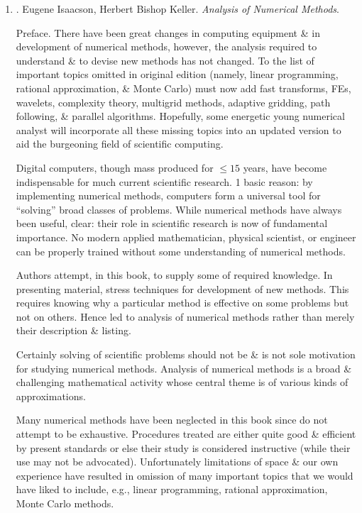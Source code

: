 \documentclass{article}
\begin{document}
\begin{enumerate}
	\item \cite{Isaacson_Keller1994}. {\sc Eugene Isaacson, Herbert Bishop Keller}. {\it Analysis of Numerical Methods}.
	
	{\sf Preface.} There have been great changes in computing equipment \& in development of numerical methods, however, the analysis required to understand \& to devise new methods has not changed. To the list of important topics omitted in original edition (namely, linear programming, rational approximation, \& Monte Carlo) must now add fast transforms, FEs, wavelets, complexity theory, multigrid methods, adaptive gridding, path following, \& parallel algorithms. Hopefully, some energetic young numerical analyst will incorporate all these missing topics into an updated version to aid the burgeoning field of scientific computing.
	
	Digital computers, though mass produced for $\le15$ years, have become indispensable for much current scientific research. 1 basic reason: by implementing numerical methods, computers form a universal tool for ``solving'' broad classes of problems. While numerical methods have always been useful, clear: their role in scientific research is now of fundamental importance. No modern applied mathematician, physical scientist, or engineer can be properly trained without some understanding of numerical methods.
	
	Authors attempt, in this book, to supply some of required knowledge. In presenting material, stress techniques for development of new methods. This requires knowing why a particular method is effective on some problems but not on others. Hence led to analysis of numerical methods rather than merely their description \& listing.
	
	Certainly solving of scientific problems should not be \& is not sole motivation for studying numerical methods. Analysis of numerical methods is a broad \& challenging mathematical activity whose central theme is  of various kinds of approximations.
	
	Many numerical methods have been neglected in this book since do not attempt to be exhaustive. Procedures treated are either quite good \& efficient by present standards or else their study is considered instructive (while their use may not be advocated). Unfortunately limitations of space \& our own experience have resulted in omission of many important topics that we would have liked to include, e.g., linear programming, rational approximation, Monte Carlo methods.
	

\end{enumerate}
\end{document}
